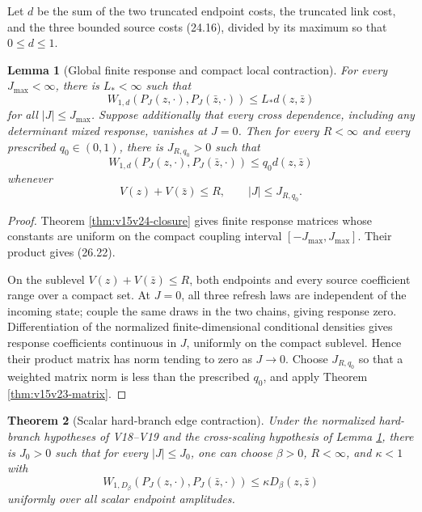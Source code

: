 \documentclass[11pt]{article}
\newtheorem{theorem}{Theorem}[section]
\newtheorem{lemma}[theorem]{Lemma}
\theoremstyle{remark}
\begin{document}
Let \(d\) be the sum of the two truncated endpoint costs, the
truncated link cost, and the three bounded source costs (24.16),
divided by its maximum so that \(0\le d\le1\).

\begin{lemma}[Global finite response and compact local contraction]
\label{lem:v15v26-two-regions}
For every \(J_{\max}<\infty\), there is \(L_*<\infty\) such that
\[
 W_{1,d}(P_J(z,\cdot),P_J(\bar z,\cdot))
 \le L_*d(z,\bar z)                                        \tag{26.22}
\]
for all \(|J|\le J_{\max}\).  Suppose additionally that every
cross dependence, including any determinant mixed response, vanishes
at \(J=0\).  Then for every \(R<\infty\) and every prescribed
\(q_0\in(0,1)\), there is \(J_{R,q_0}>0\) such that
\[
 W_{1,d}(P_J(z,\cdot),P_J(\bar z,\cdot))
 \le q_0d(z,\bar z)                                        \tag{26.23}
\]
whenever
\[
 V(z)+V(\bar z)\le R,\qquad |J|\le J_{R,q_0}.
\]
\end{lemma}

\begin{proof}
Theorem \ref{thm:v15v24-closure} gives finite response matrices
whose constants are uniform on the compact coupling interval
\([-J_{\max},J_{\max}]\).  Their product gives (26.22).

On the sublevel \(V(z)+V(\bar z)\le R\), both endpoints and every
source coefficient range over a compact set.  At \(J=0\), all three
refresh laws are independent of the incoming state; couple the
same draws in the two chains, giving response zero.  Differentiation
of the normalized finite-dimensional conditional densities gives
response coefficients continuous in \(J\), uniformly on the
compact sublevel.  Hence their product matrix has norm tending to
zero as \(J\to0\).  Choose \(J_{R,q_0}\) so that a weighted matrix norm is
less than the prescribed \(q_0\), and apply Theorem
\ref{thm:v15v23-matrix}.
\end{proof}

\begin{theorem}[Scalar hard-branch edge contraction]
\label{thm:v15v26-scalar}
Under the normalized hard-branch hypotheses of V18--V19 and the
cross-scaling hypothesis of Lemma
\ref{lem:v15v26-two-regions}, there is \(J_0>0\) such that for
every \(|J|\le J_0\), one can choose \(\beta>0\), \(R<\infty\),
and \(\kappa<1\) with
\[
 \boxed{
 W_{1,D_\beta}(P_J(z,\cdot),P_J(\bar z,\cdot))
 \le\kappa D_\beta(z,\bar z)}                              \tag{26.24}
\]
uniformly over all scalar endpoint amplitudes.
\end{theorem}
\end{document}
